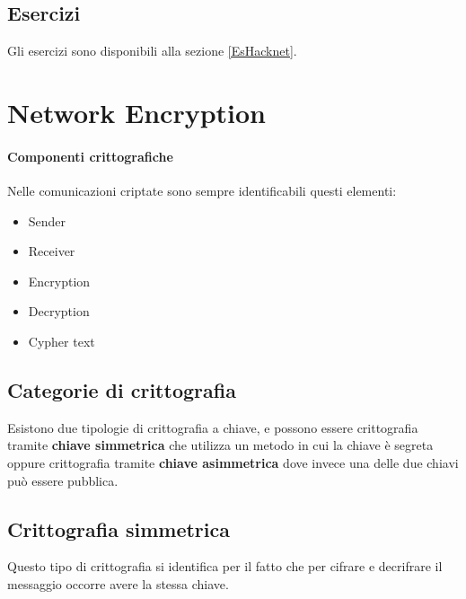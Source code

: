 \subsection{Esercizi}

Gli esercizi sono disponibili alla sezione \ref{EsHacknet}.


\section{Network Encryption}

\paragraph*{Componenti crittografiche}
Nelle comunicazioni criptate sono sempre identificabili questi elementi:
\begin{itemize}
\item Sender
\item Receiver
\item Encryption
\item Decryption
\item Cypher text
\end{itemize}


\subsection{Categorie di crittografia}

Esistono due tipologie di crittografia a chiave, e possono essere crittografia 
tramite \textbf{chiave simmetrica} che utilizza un metodo in cui la chiave è 
segreta oppure crittografia tramite \textbf{chiave asimmetrica} dove invece una 
delle due chiavi può essere pubblica.

\subsection{Crittografia simmetrica}

Questo tipo di crittografia si identifica per il fatto che per cifrare e 
decrifrare il messaggio occorre avere la stessa chiave.

